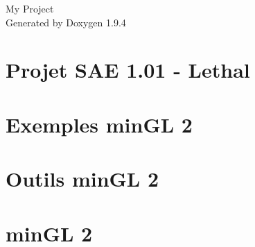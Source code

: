 \documentclass[twoside]{book}
\newcommand{\+}{\discretionary{\mbox{\scriptsize$\hookleftarrow$}}{}{}}
\newcommand{\clearemptydoublepage}{%
    \newpage{\pagestyle{empty}\cleardoublepage}%
  }
\begin{document}
  \raggedbottom
    \hypersetup{pageanchor=false,
                bookmarksnumbered=true,
                pdfencoding=unicode
               }
  \begin{titlepage}
  \vspace*{7cm}
  \begin{center}%
  {\Large My Project}\\
  \vspace*{1cm}
  {\large Generated by Doxygen 1.9.4}\\
  \end{center}
  \end{titlepage}
  \clearemptydoublepage
  \tableofcontents
  \clearemptydoublepage
  \hypersetup{pageanchor=true}
\chapter{Projet SAE 1.01 -\/ Lethal}
\label{md__home__theo__t_xC3_xA9l_xC3_xA9chargements_sae__r_e_a_d_m_e}

\chapter{Exemples min\+GL 2}
\label{md__home__theo__t_xC3_xA9l_xC3_xA9chargements_sae__min_g_l2__i_u_t__a_i_x_master_examples__r_e_a_d_m_e}

\chapter{Outils min\+GL 2}
\label{md__home__theo__t_xC3_xA9l_xC3_xA9chargements_sae__min_g_l2__i_u_t__a_i_x_master_tools__r_e_a_d_m_e}

\chapter{min\+GL 2}
\label{md__home__theo__t_xC3_xA9l_xC3_xA9chargements_sae__min_g_l2__i_u_t__a_i_x_master__r_e_a_d_m_e}

\end{document}
